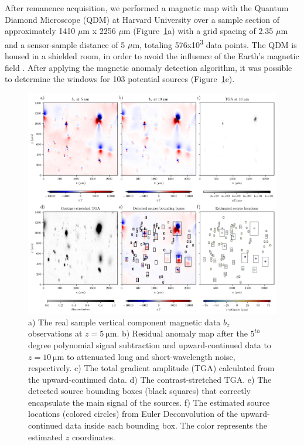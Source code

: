 After remanence acquisition, we performed a magnetic map with the Quantum
Diamond Microscope (QDM) at Harvard University over a sample section of
approximately 1410 $\mu$m x 2256 $\mu$m (Figure~\ref{real-data}a) with a grid
spacing of 2.35 $\mu$m and a sensor-sample distance of 5 $\mu$m, totaling
576x10\textsuperscript{3} data points. The QDM is housed in a shielded room, in
order to avoid the influence of the Earth's magnetic field \citep{Fu2020,
Glenn2017}. After applying the magnetic anomaly detection algorithm, it was
possible to determine the windows for 103 potential sources
(Figure~\ref{real-data}e).

\begin{figure}[tb]
\centering
\includegraphics[width=1\linewidth]{figures/real-data.png}
\caption{
    a) The real sample vertical component magnetic data $b_z$ observations at 
    $z = \qty{5}{\micro\meter}$. 
    b) Residual anomaly map after the $5^{th}$ degree polynomial signal subtraction and upward-continued data to $z = \qty{10}{\micro\meter}$ to attenuated long and short-wavelength noise, respectively.
    c) The total gradient amplitude (TGA) calculated from the 
    upward-continued data. 
    d) The contrast-stretched TGA.
    e) The detected source bounding boxes (black squares) that correctly
    encapsulate the main signal of the sources.
    f) The estimated source locations (colored circles) from Euler 
    Deconvolution of the upward-continued data inside each bounding box. 
    The color represents the estimated $z$ coordinates.
  }
\label{real-data}
\end{figure}

